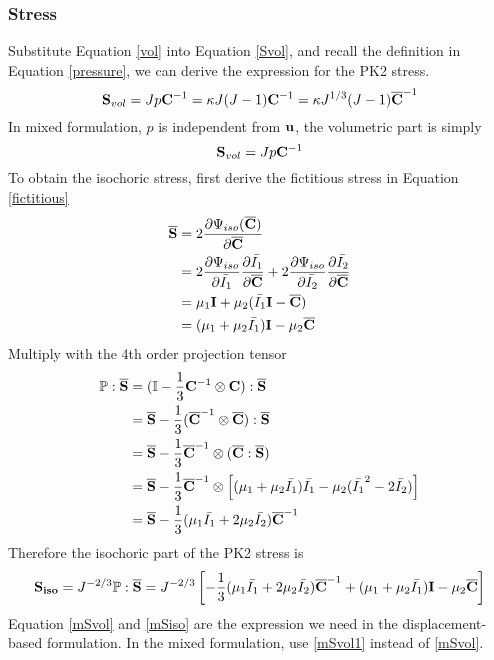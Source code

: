 %
\subsubsection{Stress}
Substitute Equation \ref{vol} into Equation \ref{Svol}, and recall the definition in Equation \ref{pressure}, we can derive the expression for the PK2 stress.
\begin{equation} \label{mSvol}
\bold{S}_{vol} = Jp\bold{C}^{-1} = \kappa{J(J-1)}\bold{C}^{-1} = \kappa{J^{1/3}(J-1)}\bold{\overline{C}}^{-1}
\end{equation}
In mixed formulation, $p$ is independent from $\bold{u}$, the volumetric part is simply
\begin{equation} \label{mSvol1}
\bold{S}_{vol} = Jp\bold{C}^{-1}
\end{equation}
To obtain the isochoric stress, first derive the fictitious stress in Equation \ref{fictitious}
\begin{equation} \label{mfictitious}
\begin{split}
\overline{\bold{S}} &= 2\frac{\partial\Psi_{iso}({\overline{\bold{C}})}}{\partial\overline{\bold{C}}} \\
&= 2\frac{\partial\Psi_{iso}}{\partial\bar{I_1}} \frac{\partial\bar{I_1}}{\partial\overline{\bold{C}}}  + 2\frac{\partial\Psi_{iso}}{\partial\bar{I_2}} \frac{\partial\bar{I_2}}{\partial\overline{\bold{C}}} \\
&= \mu_1{\bold{I}} + \mu_2({\bar{I_1}\bold{I} - \overline{\bold{C}}}) \\
&= (\mu_1+\mu_2\bar{I_1})\bold{I} - \mu_2{\overline{\bold{C}}}
\end{split}
\end{equation}
Multiply with the 4th order projection tensor
\begin{equation}
\begin{split}
\mathbb{P}:\overline{\bold{S}} &= ( \mathbb{I} - \frac{1}{3}\bold{C}^{-1} \otimes \bold{C} ) : \overline{\bold{S}} \\
&= \overline{\bold{S}} - \frac{1}{3}( \overline{\bold{C}}^{-1} \otimes \overline{\bold{C}} ) : \overline{\bold{S}} \\
&= \overline{\bold{S}} - \frac{1}{3} \overline{\bold{C}}^{-1} \otimes (\overline{\bold{C}} : \overline{\bold{S}}) \\
&= \overline{\bold{S}} - \frac{1}{3} \overline{\bold{C}}^{-1} \otimes \left[(\mu_1+\mu_2\bar{I_1})\bar{I_1} - \mu_2(\bar{I_1}^2-2\bar{I_2})\right]\\
&= \overline{\bold{S}} -  \frac{1}{3}(\mu_1\bar{I_1} + 2\mu_2\bar{I_2}) \overline{\bold{C}}^{-1} 
\end{split}
\end{equation}
Therefore the isochoric part of the PK2 stress is
\begin{equation} \label{mSiso}
\bold{S_{iso}} = J^{-2/3}\mathbb{P}:\overline{\bold{S}} = J^{-2/3}\left[    - \frac{1}{3}(\mu_1\bar{I_1} + 2\mu_2\bar{I_2}) \overline{\bold{C}}^{-1}  + (\mu_1 + \mu_2\bar{I_1})\bold{I} - \mu_2\overline{\bold{C}} \right]
\end{equation}
Equation \ref{mSvol} and \ref{mSiso} are the expression we need in the displacement-based formulation. In the mixed formulation, use \ref{mSvol1} instead of \ref{mSvol}.

